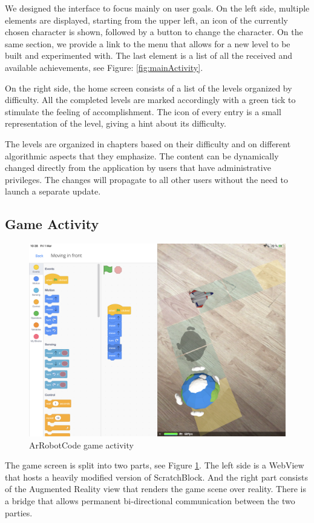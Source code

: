 \documentclass[12 pct]{report}
\begin{document}
We designed the interface to focus mainly on user goals.
On the left side, multiple elements are displayed, starting from the upper left, an icon of the currently chosen character is shown, followed by a button to change the character.
On the same section, we provide a link to the menu that allows for a new level to be built and experimented with. 
The last element is a list of all the received and available achievements, see Figure: \ref{fig:mainActivity}.

On the right side, the home screen consists of a list of the levels organized by difficulty. 
All the completed levels are marked accordingly with a green tick to stimulate the feeling of accomplishment. 
The icon of every entry is a small representation of the level, giving a hint about its difficulty. 

The levels are organized in chapters based on their difficulty and on different algorithmic aspects that they emphasize. 
The content can be dynamically changed directly from the application by users that have administrative privileges. 
The changes will propagate to all other users without the need to launch a separate update.

\subsection*{Game Activity}
\begin{figure}[H]
\includegraphics[width=1.0\textwidth]{ArRobotCode2}
\centering
\caption{ArRobotCode game activity}
\label{fig:gameScreen}
\end{figure}
The game screen is split into two parts, see Figure \ref{fig:gameScreen}. 
The left side is a WebView \cite{hazarika2014recommendations} that hosts a heavily modified version of ScratchBlock. 
And the right part consists of the Augmented Reality view that renders the game scene over reality. 
There is a bridge that allows permanent bi-directional communication between the two parties.
\end{document}
